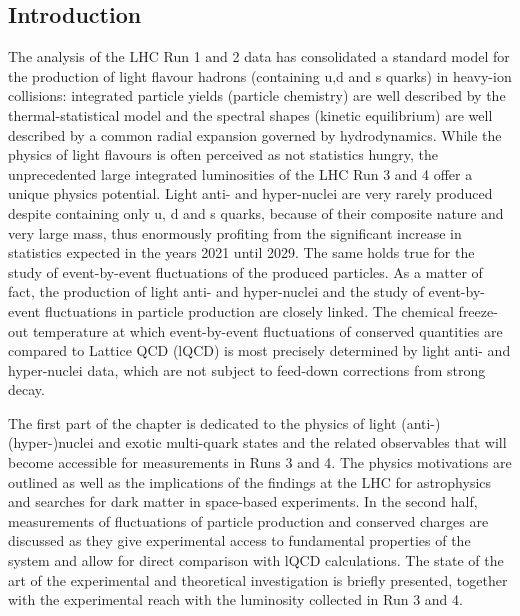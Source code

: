 \subsection{Introduction}
The analysis of the LHC Run 1 and 2 data has consolidated a standard model for the production of light flavour hadrons (containing u,d and s quarks) in heavy-ion collisions:
integrated particle yields (particle chemistry) are well described by the thermal-statistical model and  
the spectral shapes (kinetic equilibrium) are well described by a common radial expansion governed by hydrodynamics.
While the physics of light flavours is often perceived as not statistics hungry, the unprecedented large integrated luminosities of the LHC Run 3 and 4 offer a unique physics potential. Light anti- and hyper-nuclei are very rarely produced despite containing only u, d and s quarks, because of their composite nature and very large mass, thus enormously profiting from the significant increase in statistics expected in the years 2021 until 2029. 
The same holds true for the study of event-by-event fluctuations of the produced particles.
As a matter of fact, the production of light anti- and hyper-nuclei and the study of event-by-event fluctuations in particle production are closely linked. 
The chemical freeze-out temperature at which event-by-event fluctuations of conserved quantities are compared to Lattice QCD (lQCD) is most precisely determined by light anti- and hyper-nuclei data, which are not subject to feed-down corrections from strong decay.

The first part of the chapter is dedicated to the physics of light (anti-)(hyper-)nuclei and exotic multi-quark states and the related observables that will become accessible for measurements in Runs 3 and 4. 
The physics motivations are outlined as well as the implications of the findings at the LHC for astrophysics and searches for dark matter in space-based experiments.
In the second half, measurements of fluctuations of particle production and conserved charges are discussed as they give experimental access to fundamental properties of the system and allow for direct comparison with lQCD calculations. 
The state of the art of the experimental and theoretical investigation is briefly presented, together with the experimental reach  with the luminosity collected in Run 3 and 4.

